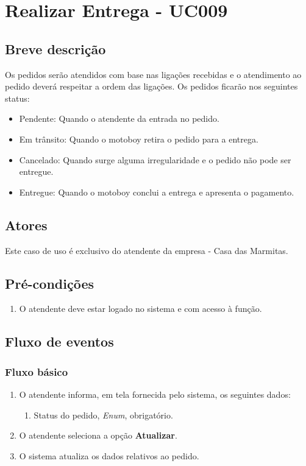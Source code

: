 \chapter{Realizar Entrega - UC009} \label{uc009}

\section{Breve descrição}

Os pedidos serão atendidos com base nas ligações recebidas e o atendimento ao pedido deverá respeitar a ordem das ligações. Os pedidos ficarão nos seguintes status:

\begin{itemize}
	\item Pendente: Quando o atendente da entrada no pedido.
	\item Em trânsito: Quando o motoboy retira o pedido para a entrega.
	\item Cancelado: Quando surge alguma irregularidade e o pedido não pode ser entregue.
	\item Entregue: Quando o motoboy conclui a entrega e apresenta o pagamento.
\end{itemize}

\section{Atores}

Este caso de uso é exclusivo do atendente da empresa - Casa das Marmitas.

\section{Pré-condições}

\begin{enumerate}
	\item O atendente deve estar logado no sistema e com acesso à função.
\end{enumerate}

\section{Fluxo de eventos}

\subsection{Fluxo básico}

\begin{enumerate}
	\item O atendente informa, em tela fornecida pelo sistema, os seguintes dados:
	\begin{enumerate}
		\item Status do pedido, \emph{Enum}, obrigatório.		
	\end{enumerate}
	\item O atendente seleciona a opção \textbf{Atualizar}.
	\item O sistema atualiza os dados relativos ao pedido.
\end{enumerate}


